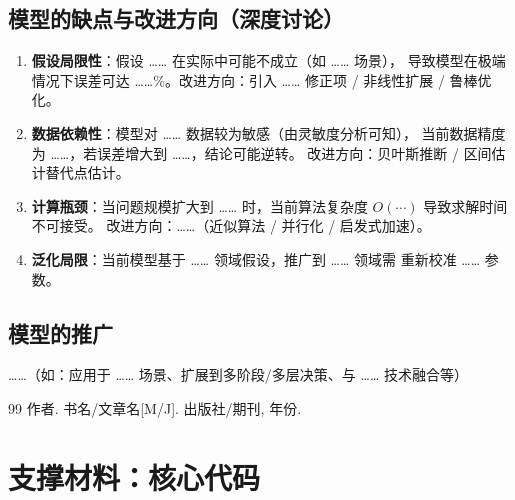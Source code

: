 \documentclass[12pt]{ctexart}
\begin{document}
\subsection{模型的缺点与改进方向（深度讨论）}
\begin{enumerate}[label=(\arabic*)]
  \item \textbf{假设局限性}：假设 …… 在实际中可能不成立（如 …… 场景），
        导致模型在极端情况下误差可达 ……\%。改进方向：引入 …… 修正项 /
        非线性扩展 / 鲁棒优化。
  \item \textbf{数据依赖性}：模型对 …… 数据较为敏感（由灵敏度分析可知），
        当前数据精度为 ……，若误差增大到 ……，结论可能逆转。
        改进方向：贝叶斯推断 / 区间估计替代点估计。
  \item \textbf{计算瓶颈}：当问题规模扩大到 …… 时，当前算法复杂度
        $O(\cdots)$ 导致求解时间不可接受。
        改进方向：……（近似算法 / 并行化 / 启发式加速）。
  \item \textbf{泛化局限}：当前模型基于 …… 领域假设，推广到 …… 领域需
        重新校准 …… 参数。
\end{enumerate}

\subsection{模型的推广}
……（如：应用于 …… 场景、扩展到多阶段/多层决策、与 …… 技术融合等）

\begin{thebibliography}{99}
 作者. 书名/文章名[M/J]. 出版社/期刊, 年份.
\end{thebibliography}

\appendix
\section{支撑材料：核心代码}

\end{document}
